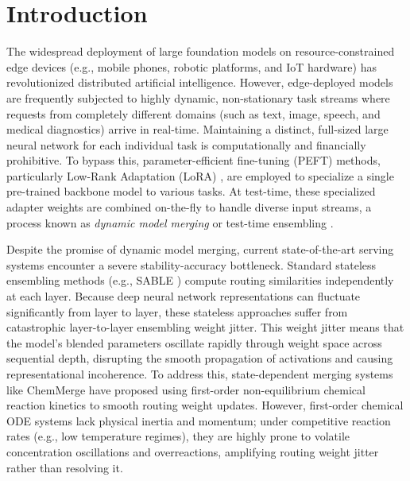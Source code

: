 \section{Introduction}
\label{sec:intro}

The widespread deployment of large foundation models on resource-constrained edge devices (e.g., mobile phones, robotic platforms, and IoT hardware) has revolutionized distributed artificial intelligence. However, edge-deployed models are frequently subjected to highly dynamic, non-stationary task streams where requests from completely different domains (such as text, image, speech, and medical diagnostics) arrive in real-time. Maintaining a distinct, full-sized large neural network for each individual task is computationally and financially prohibitive. To bypass this, parameter-efficient fine-tuning (PEFT) methods, particularly Low-Rank Adaptation (LoRA) \cite{hu21lora}, are employed to specialize a single pre-trained backbone model to various tasks. At test-time, these specialized adapter weights are combined on-the-fly to handle diverse input streams, a process known as \textit{dynamic model merging} or test-time ensembling \cite{liang23sable, zhang24spszca}.

Despite the promise of dynamic model merging, current state-of-the-art serving systems encounter a severe stability-accuracy bottleneck. Standard stateless ensembling methods (e.g., SABLE \cite{liang23sable}) compute routing similarities independently at each layer. Because deep neural network representations can fluctuate significantly from layer to layer, these stateless approaches suffer from catastrophic layer-to-layer ensembling weight jitter. This weight jitter means that the model's blended parameters oscillate rapidly through weight space across sequential depth, disrupting the smooth propagation of activations and causing representational incoherence. To address this, state-dependent merging systems like ChemMerge have proposed using first-order non-equilibrium chemical reaction kinetics to smooth routing weight updates. However, first-order chemical ODE systems lack physical inertia and momentum; under competitive reaction rates (e.g., low temperature regimes), they are highly prone to volatile concentration oscillations and overreactions, amplifying routing weight jitter rather than resolving it.

